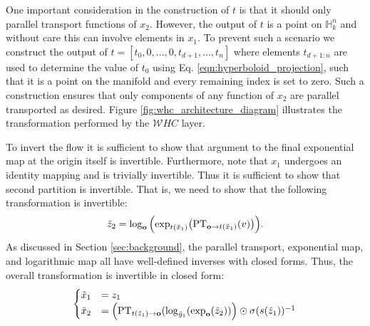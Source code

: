 One important consideration in the construction of $t$ is that it should only parallel transport functions of $x_2$. However, the output of $t$ is a point on $\mathbb{H}^n_k$ and without care this can involve elements in $x_1$. To prevent such a scenario we construct the output of $t = [t_0, 0, \dots , 0, t_{d+1}, \dots , t_{n}]$ where elements $t_{d+1:n}$ are used to determine the value of $t_0$ using Eq. \ref{eqn:hyperboloid_projection}, such that it is a point on the manifold and every remaining index is set to zero. Such a construction ensures that only components of any function of $x_2$ are parallel transported as desired. Figure \ref{fig:whc_architecture_diagram} illustrates the transformation performed by the $\mathcal{W}HC$ layer.

To invert the flow it is sufficient to show that argument to the final exponential map at the origin itself is invertible. Furthermore, note that $x_1$ undergoes an identity mapping and is trivially invertible. Thus it is sufficient to show that second partition is invertible. That is, we need to show that the following transformation is invertible:
\begin{equation}
     \tilde{z}_{2} = \log_{\textbf{o}}\Big( \textnormal{exp}_{t(\tilde{x}_{1})}\big(\textnormal{PT}_{\textbf{o}\to t(\tilde{x}_{1}) }(v)\big)\Big).
\end{equation}
As discussed in Section \ref{sec:background}, the parallel transport, exponential map, and logarithmic map all have well-defined inverses with closed forms. Thus, the overall transformation is invertible in closed form:
\begin{align*}
     \begin{cases}
     \tilde{x}_{1} &= z_{1} \\
     \tilde{x}_{2} &= \Big( \textnormal{PT}_{t(\tilde{z}_{1}) \to \textbf{o} }(\log_{\tilde{y}_{1}}( \textnormal{exp}_{\textbf{o}}(\tilde{z}_{2}))\Big) \odot \sigma(s(\tilde{z}_{1}))^{-1} \\
    \end{cases}
\end{align*}

